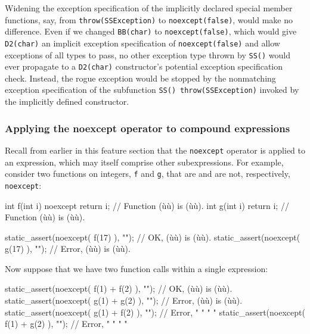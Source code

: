 Widening the exception specification of the implicitly declared special
member functions, say, from \lstinline!throw(SSException)! to
\lstinline!noexcept(false)!, would make no difference. Even if we changed
\lstinline!BB(char)! to \lstinline!noexcept(false)!, which would give
\lstinline!D2(char)! an implicit exception specification of
\lstinline!noexcept(false)! and allow exceptions of all types to pass, no
other exception type thrown by \lstinline!SS()! would ever propagate to a
\lstinline!D2(char)! constructor's potential exception specification check.
Instead, the rogue exception would be stopped by the nonmatching
exception specification of the subfunction
\lstinline!SS()!~\lstinline!throw(SSException)! invoked by the implicitly
defined constructor.

\subsubsection[Applying the \lstinline!noexcept! operator to compound expressions]{Applying the {\SubsubsecCode noexcept} operator to compound expressions}\label{applying-the-noexcept-operator-to-compound-expressions}

Recall from earlier in this feature section that the \lstinline!noexcept!
operator is applied to an expression, which may itself comprise other
subexpressions. For example, consider two functions on integers,
\lstinline!f! and \lstinline!g!, that are and are not, respectively,
\lstinline!noexcept!:

\begin{emcppslisting}[emcppsbatch=e8]
int f(int i) noexcept { return i; }  // Function (ù{}ù) is (ù{}ù).
int g(int i)          { return i; }  // Function (ù{}ù) is (ù{}ù).

static_assert(noexcept( f(17) ), "");  // OK,    (ù{}ù) is (ù{}ù).
static_assert(noexcept( g(17) ), "");  // Error, (ù{}ù) is (ù{}ù).
\end{emcppslisting}
    

\noindent Now suppose that we have two function calls within a single expression:

\begin{emcppslisting}[emcppsbatch=e8]
static_assert(noexcept( f(1) + f(2) ), "");  // OK,    (ù{}ù) is (ù{}ù).
static_assert(noexcept( g(1) + g(2) ), "");  // Error, (ù{}ù) is (ù{}ù).
static_assert(noexcept( g(1) + f(2) ), "");  // Error,  "   "      "      "
static_assert(noexcept( f(1) + g(2) ), "");  // Error,  "   "      "      "
\end{emcppslisting}
    

